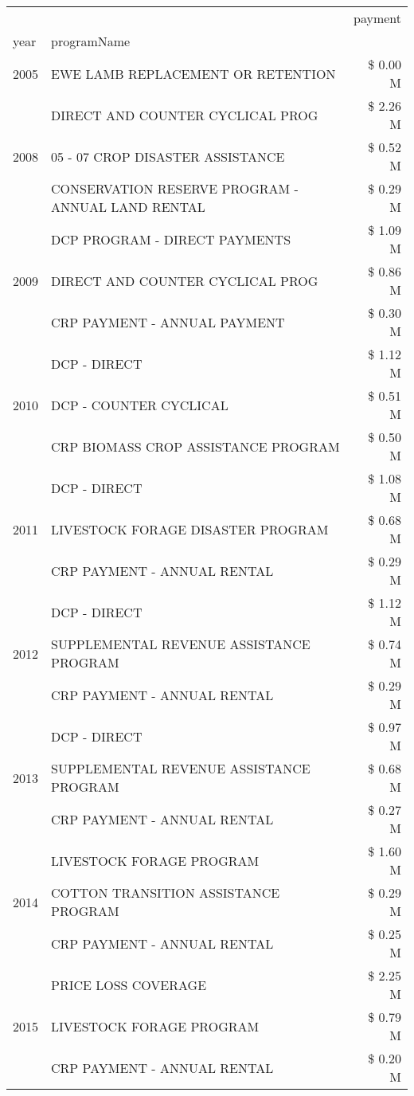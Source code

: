 \begin{tabular}{llr}
\toprule
 &  & payment \\
year & programName &  \\
\midrule
2005 & EWE LAMB REPLACEMENT OR RETENTION & \$ 0.00 M \\
\cline{1-3}
\multirow[t]{3}{*}{2008} & DIRECT AND COUNTER CYCLICAL PROG & \$ 2.26 M \\
 & 05 - 07 CROP DISASTER ASSISTANCE & \$ 0.52 M \\
 & CONSERVATION RESERVE PROGRAM - ANNUAL LAND RENTAL & \$ 0.29 M \\
\cline{1-3}
\multirow[t]{3}{*}{2009} & DCP PROGRAM - DIRECT PAYMENTS & \$ 1.09 M \\
 & DIRECT AND COUNTER CYCLICAL PROG & \$ 0.86 M \\
 & CRP PAYMENT - ANNUAL PAYMENT & \$ 0.30 M \\
\cline{1-3}
\multirow[t]{3}{*}{2010} & DCP - DIRECT & \$ 1.12 M \\
 & DCP - COUNTER CYCLICAL & \$ 0.51 M \\
 & CRP BIOMASS CROP ASSISTANCE PROGRAM & \$ 0.50 M \\
\cline{1-3}
\multirow[t]{3}{*}{2011} & DCP - DIRECT & \$ 1.08 M \\
 & LIVESTOCK FORAGE DISASTER PROGRAM & \$ 0.68 M \\
 & CRP PAYMENT - ANNUAL RENTAL & \$ 0.29 M \\
\cline{1-3}
\multirow[t]{3}{*}{2012} & DCP - DIRECT & \$ 1.12 M \\
 & SUPPLEMENTAL REVENUE ASSISTANCE PROGRAM & \$ 0.74 M \\
 & CRP PAYMENT - ANNUAL RENTAL & \$ 0.29 M \\
\cline{1-3}
\multirow[t]{3}{*}{2013} & DCP - DIRECT & \$ 0.97 M \\
 & SUPPLEMENTAL REVENUE ASSISTANCE PROGRAM & \$ 0.68 M \\
 & CRP PAYMENT - ANNUAL RENTAL & \$ 0.27 M \\
\cline{1-3}
\multirow[t]{3}{*}{2014} & LIVESTOCK FORAGE PROGRAM & \$ 1.60 M \\
 & COTTON TRANSITION ASSISTANCE PROGRAM & \$ 0.29 M \\
 & CRP PAYMENT - ANNUAL RENTAL & \$ 0.25 M \\
\cline{1-3}
\multirow[t]{3}{*}{2015} & PRICE LOSS COVERAGE & \$ 2.25 M \\
 & LIVESTOCK FORAGE PROGRAM & \$ 0.79 M \\
 & CRP PAYMENT - ANNUAL RENTAL & \$ 0.20 M \\

\end{tabular}
